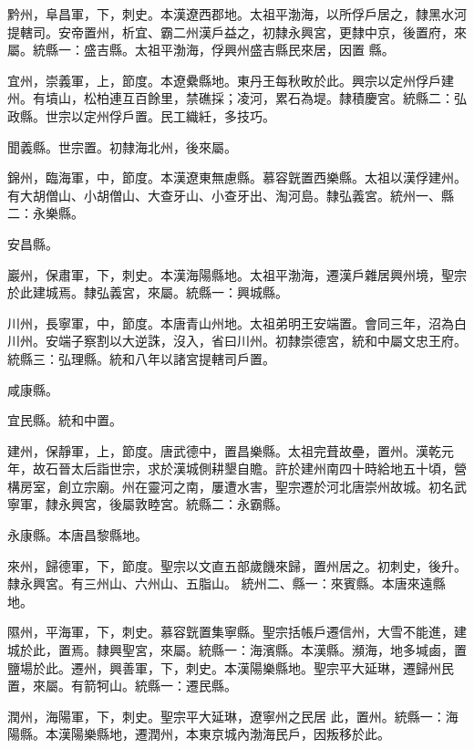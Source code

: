 \begin{pinyinscope}
 黔州，阜昌軍，下，刺史。本漢遼西郡地。太祖平渤海，以所俘戶居之，隸黑水河提轄司。安帝置州，析宜、霸二州漢戶益之，初隸永興宮，更隸中京，後置府，來屬。統縣一：盛吉縣。太祖平渤海，俘興州盛吉縣民來居，因置
 縣。



 宜州，崇義軍，上，節度。本遼纍縣地。東丹王每秋畋於此。興宗以定州俘戶建州。有墳山，松柏連互百餘里，禁礁採；凌河，累石為堤。隸積慶宮。統縣二：弘政縣。世宗以定州俘戶置。民工織紝，多技巧。



 聞義縣。世宗置。初隸海北州，後來屬。



 錦州，臨海軍，中，節度。本漢遼東無慮縣。慕容皝置西樂縣。太祖以漢俘建州。有大胡僧山、小胡僧山、大查牙山、小查牙出、淘河島。隸弘義宮。統州一、縣二：永樂縣。



 安昌縣。



 巖州，保肅軍，下，刺史。本漢海陽縣地。太祖平渤海，遷漢戶雜居興州境，聖宗於此建城焉。隸弘義宮，來屬。統縣一：興城縣。



 川州，長寧軍，中，節度。本唐青山州地。太祖弟明王安端置。會同三年，沼為白川州。安端子察割以大逆誅，沒入，省曰川州。初隸崇德宮，統和中屬文忠王府。統縣三：弘理縣。統和八年以諸宮提轄司戶置。



 咸康縣。



 宜民縣。統和中置。



 建州，保靜軍，上，節度。唐武德中，置昌樂縣。太祖完葺故壘，置州。漢乾元年，故石晉太后詣世宗，求於漢城側耕墾自贍。許於建州南四十時給地五十頃，營構房室，創立宗廟。州在靈河之南，屢遭水害，聖宗遷於河北唐崇州故城。初名武寧軍，隸永興宮，後屬敦睦宮。統縣二：永霸縣。



 永康縣。本唐昌黎縣地。



 來州，歸德軍，下，節度。聖宗以文直五部歲饑來歸，置州居之。初刺史，後升。隸永興宮。有三州山、六州山、五脂山。
 統州二、縣一：來賓縣。本唐來遠縣地。



 隰州，平海軍，下，刺史。慕容皝置集寧縣。聖宗括帳戶遷信州，大雪不能進，建城於此，置焉。隸興聖宮，來屬。統縣一：海濱縣。本漢縣。瀕海，地多堿鹵，置鹽場於此。遷州，興善軍，下，刺史。本漢陽樂縣地。聖宗平大延琳，遷歸州民置，來屬。有箭牱山。統縣一：遷民縣。



 潤州，海陽軍，下，刺史。聖宗平大延琳，遼寧州之民居
 此，置州。統縣一：海陽縣。本漢陽樂縣地，遷潤州，本東京城內渤海民戶，因叛移於此。



\end{pinyinscope}